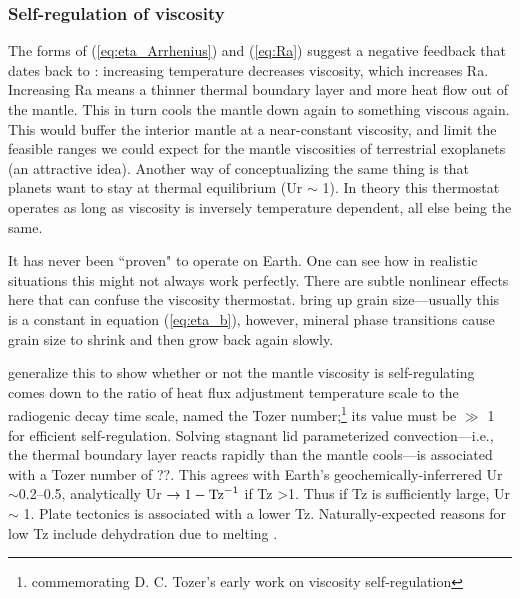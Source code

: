 \subsubsection{Self-regulation of viscosity}

The forms of (\ref{eq:eta_Arrhenius}) and (\ref{eq:Ra}) suggest a negative feedback that dates back to \citet{Urey1955}: increasing temperature decreases viscosity, which increases Ra. Increasing Ra means a thinner thermal boundary layer and more heat flow out of the mantle. This in turn cools the mantle down again to something viscous again. This would buffer the interior mantle at a near-constant viscosity, and limit the feasible ranges we could expect for the mantle viscosities of terrestrial exoplanets (an attractive idea). Another way of conceptualizing the same thing is that planets want to stay at thermal equilibrium (Ur $\sim$ 1).%
In theory this thermostat operates as long as viscosity is inversely temperature dependent, all else being the same. 

It has never been ``proven" to operate on Earth. One can see how in realistic situations this might not always work perfectly. There are subtle nonlinear effects here that can confuse the viscosity thermostat. \citet{Solomatov1996} bring up grain size---usually this is a constant in equation (\ref{eq:eta_b}), however, mineral phase transitions cause grain size to shrink and then grow back again slowly. 

\citet{Korenaga2008a} generalize this to show whether or not the mantle viscosity is self-regulating comes down to the ratio of heat flux adjustment temperature scale to the radiogenic decay time scale, named the Tozer number;\footnote{commemorating D. C. Tozer's early work on viscosity self-regulation} its value must be $\gg$ 1 for efficient self-regulation. Solving stagnant lid parameterized convection---i.e., the thermal boundary layer reacts rapidly than the mantle cools---is associated with a Tozer number of ??. This agrees with Earth's geochemically-inferrered Ur $\sim$0.2--0.5, analytically Ur $\to 1 - \rm{Tz}^{-1}$ if Tz \textgreater  1. Thus if Tz is sufficiently large, Ur $\sim$ 1. Plate tectonics is associated with a lower Tz. Naturally-expected reasons for low Tz include dehydration due to melting \citep{Korenaga2009}
.




